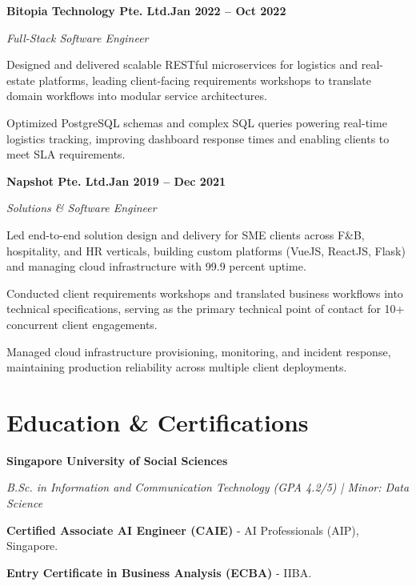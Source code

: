\documentclass[letterpaper,10pt]{article}
\newcommand{\headingBf}[2]{\par\noindent\hspace*{10pt}\textbf{#1}\hfill\textbf{#2}}
\newcommand{\headingIt}[2]{\par\noindent\hspace*{10pt}\textit{#1}\hfill\textit{#2}}
\newenvironment{resume_list}{\vspace{-7pt}\begin{itemize}[itemsep=-2pt, parsep=1pt, leftmargin=30pt]}{\end{itemize}}
\begin{document}
  \headingBf{Bitopia Technology Pte. Ltd.}{Jan 2022 -- Oct 2022}
  \headingIt{Full-Stack Software Engineer}{}
  \begin{resume_list}
    \item Designed and delivered scalable RESTful microservices for logistics and real-estate platforms, leading client-facing requirements workshops to translate domain workflows into modular service architectures.
    \item Optimized PostgreSQL schemas and complex SQL queries powering real-time logistics tracking, improving dashboard response times and enabling clients to meet SLA requirements.
  \end{resume_list}

  \headingBf{Napshot Pte. Ltd.}{Jan 2019 -- Dec 2021}
  \headingIt{Solutions \& Software Engineer}{}
  \begin{resume_list}
    \item Led end-to-end solution design and delivery for SME clients across F\&B, hospitality, and HR verticals, building custom platforms (VueJS, ReactJS, Flask) and managing cloud infrastructure with 99.9 percent uptime.
    \item Conducted client requirements workshops and translated business workflows into technical specifications, serving as the primary technical point of contact for 10+ concurrent client engagements.
    \item Managed cloud infrastructure provisioning, monitoring, and incident response, maintaining production reliability across multiple client deployments.
  \end{resume_list}

  \section{Education \& Certifications}
  \headingBf{Singapore University of Social Sciences}{}
  \headingIt{B.Sc. in Information and Communication Technology (GPA 4.2/5) | Minor: Data Science}{}
  \begin{resume_list}
    \item \textbf{Certified Associate AI Engineer (CAIE)} - AI Professionals (AIP), Singapore.
    \item \textbf{Entry Certificate in Business Analysis (ECBA)} - IIBA.
  \end{resume_list}
\end{document}
